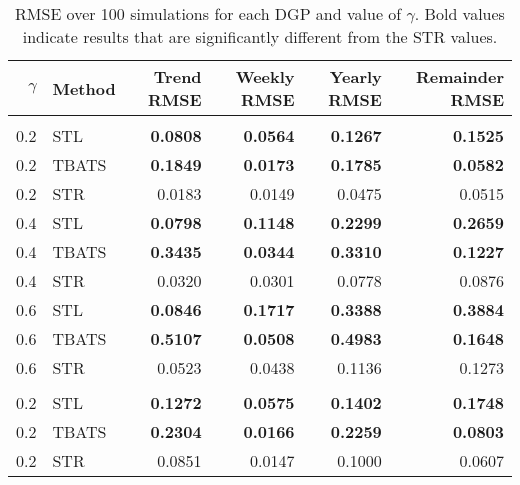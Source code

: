 \documentclass[11pt,a4paper,]{article}
\begin{document}
\begin{table}[!ht]

\caption{\label{tab:cbetable}RMSE over 100 simulations for each DGP and value of $\gamma$. Bold values indicate results that are significantly different from the STR values.}
\centering
\begin{tabular}[t]{rlrrrr}
\toprule
$\gamma$ & Method & Trend RMSE & Weekly RMSE & Yearly RMSE & Remainder RMSE\\
\midrule
\addlinespace[0.3em]
\multicolumn{6}{l}{\textbf{Stochastic DGP}}\\
\hspace{1em}0.2 & STL & \textbf{0.0808} & \textbf{0.0564} & \textbf{0.1267} & \textbf{0.1525}\\
\hspace{1em}0.2 & TBATS & \textbf{0.1849} & \textbf{0.0173} & \textbf{0.1785} & \textbf{0.0582}\\
\hspace{1em}0.2 & STR & 0.0183 & 0.0149 & 0.0475 & 0.0515\\
\midrule
\hspace{1em}0.4 & STL & \textbf{0.0798} & \textbf{0.1148} & \textbf{0.2299} & \textbf{0.2659}\\
\hspace{1em}0.4 & TBATS & \textbf{0.3435} & \textbf{0.0344} & \textbf{0.3310} & \textbf{0.1227}\\
\hspace{1em}0.4 & STR & 0.0320 & 0.0301 & 0.0778 & 0.0876\\
\midrule
\hspace{1em}0.6 & STL & \textbf{0.0846} & \textbf{0.1717} & \textbf{0.3388} & \textbf{0.3884}\\
\hspace{1em}0.6 & TBATS & \textbf{0.5107} & \textbf{0.0508} & \textbf{0.4983} & \textbf{0.1648}\\
\hspace{1em}0.6 & STR & 0.0523 & 0.0438 & 0.1136 & 0.1273\\
\midrule
\addlinespace[0.3em]
\multicolumn{6}{l}{\textbf{Deterministic GDP}}\\
\hspace{1em}0.2 & STL & \textbf{0.1272} & \textbf{0.0575} & \textbf{0.1402} & \textbf{0.1748}\\
\hspace{1em}0.2 & TBATS & \textbf{0.2304} & \textbf{0.0166} & \textbf{0.2259} & \textbf{0.0803}\\
\hspace{1em}0.2 & STR & 0.0851 & 0.0147 & 0.1000 & 0.0607\\

\end{tabular}
\end{table}
\end{document}
